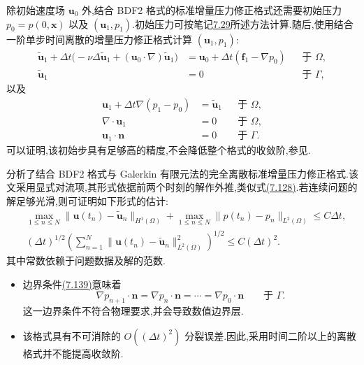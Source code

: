 \begin{note}\label{note:incremental-pressure-correction-bdf2-initial-step}
除初始速度场 $\bm{u}_0$ 外,结合 BDF2 格式的标准增量压力修正格式还需要初始压力 $p_0=p(0,\bm{x})$ 以及 $(\bm{u}_1,p_1)$.初始压力可按笔记\hyperref[note:time-dependent-initial-pressure]{7.29}所述方法计算.随后,使用结合一阶单步时间离散的增量压力修正格式计算 $(\bm{u}_1,p_1)$:
\[
\begin{aligned}
 \widetilde{\bm{u}}_1
 +\Delta t\bigl(-\nu\Delta\widetilde{\bm{u}}_1
   +(\bm{u}_0\cdot\nabla)\widetilde{\bm{u}}_1\bigr)
 &=\bm{u}_0+\Delta t(\bm{f}_1-\nabla p_0)
   &&\text{于 }\Omega,\\
 \widetilde{\bm{u}}_1&=0
   &&\text{于 }\Gamma,
\end{aligned}
\]
以及
\[
\begin{aligned}
 \bm{u}_1+\Delta t\nabla(p_1-p_0)
   &=\widetilde{\bm{u}}_1
     &&\text{于 }\Omega,\\
 \nabla\cdot\bm{u}_1&=0
     &&\text{于 }\Omega,\\
 \bm{u}_1\cdot\bm{n}&=0
     &&\text{于 }\Gamma.
\end{aligned}
\]
可以证明,该初始步具有足够高的精度,不会降低整个格式的收敛阶,参见\textcite{GuermondShen2004}.
\end{note}

\begin{note}\label{note:incremental-pressure-correction-bdf2-error}
\textcite{Guermond1999b}分析了结合 BDF2 格式与 Galerkin 有限元法的完全离散标准增量压力修正格式.该文采用显式对流项,其形式依据前两个时刻的解作外推,类似式\hyperref[eq:projection-convection-extrapolation]{(7.128)}.若连续问题的解足够光滑,则可证明如下形式的估计:
\begin{equation}\label{eq:incremental-pressure-correction-bdf2-error}
\begin{aligned}
 &\max_{1\le n\le N}
   \|\bm{u}(t_n)-\widetilde{\bm{u}}_n\|_{H^1(\Omega)}
  +\max_{1\le n\le N}
   \|p(t_n)-p_n\|_{L^2(\Omega)}
   \le C\Delta t,\\
 &(\Delta t)^{1/2}
   \left(\sum_{n=1}^{N}
     \|\bm{u}(t_n)-\widetilde{\bm{u}}_n\|_{L^2(\Omega)}^2
   \right)^{1/2}
   \le C(\Delta t)^2.
\end{aligned}
\end{equation}
其中常数依赖于问题数据及解的范数.
\end{note}

\begin{note}[关于标准增量压力修正格式]\label{note:standard-incremental-pressure-correction-properties}
\begin{itemize}
  \item 边界条件\hyperref[eq:incremental-pressure-neumann-cn]{(7.139)}意味着
  \[
   \nabla p_{n+1}\cdot\bm{n}
    =\nabla p_n\cdot\bm{n}
    =\cdots=\nabla p_0\cdot\bm{n}
      \qquad\text{于 }\Gamma.
  \]
  这一边界条件不符合物理要求,并会导致数值边界层.
  \item 该格式具有不可消除的 $O((\Delta t)^2)$ 分裂误差.因此,采用时间二阶以上的离散格式并不能提高收敛阶.
\end{itemize}
\end{note}

